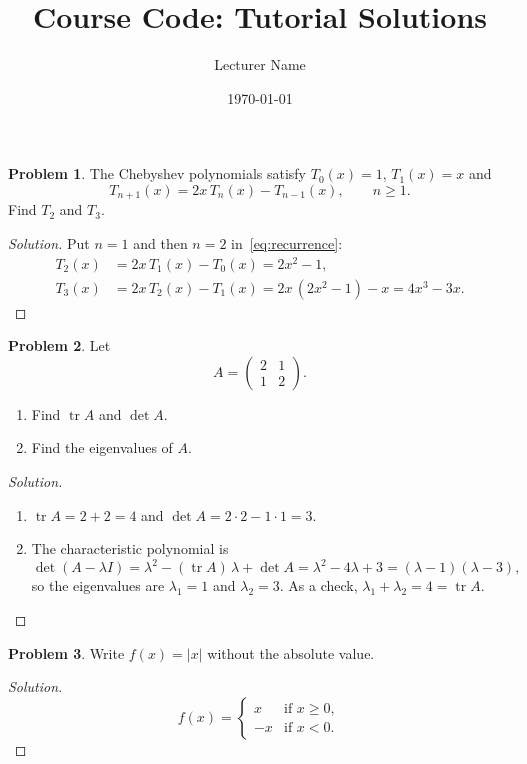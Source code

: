\documentclass[11pt,a4paper]{article}
\title{Course Code: Tutorial Solutions}%
\author{Lecturer Name}%
\date{\today}
\theoremstyle{definition}
\newtheorem{problem}{Problem}
\newenvironment{solution}{\begin{proof}[Solution]}{\end{proof}}
\DeclareMathOperator{\tr}{tr}
\begin{document}
\maketitle

\begin{problem}
  \label{prob:chebyshev}
  The Chebyshev polynomials satisfy $T_0(x) = 1$, $T_1(x) = x$ and
  \begin{equation}
    T_{n+1}(x) = 2x\,T_n(x) - T_{n-1}(x), \qquad n \geq 1.
    \label{eq:recurrence}
  \end{equation}
  Find $T_2$ and $T_3$.
\end{problem}

\begin{solution}
  Put $n = 1$ and then $n = 2$ in~\eqref{eq:recurrence}:
  \begin{align*}
    T_2(x) &= 2x\,T_1(x) - T_0(x) = 2x^2 - 1, \\
    T_3(x) &= 2x\,T_2(x) - T_1(x) = 2x\,(2x^2 - 1) - x = 4x^3 - 3x.
  \end{align*}
\end{solution}

\begin{problem}
  \label{prob:matrix}
  Let
  \[
    A = \begin{pmatrix} 2 & 1 \\ 1 & 2 \end{pmatrix}.
  \]
  \begin{enumerate}[label=(\alph*)]
    \item Find $\tr A$ and $\det A$.
    \item Find the eigenvalues of $A$.
  \end{enumerate}
\end{problem}

\begin{solution}
  \begin{enumerate}[label=(\alph*)]
    \item $\tr A = 2 + 2 = 4$ and $\det A = 2 \cdot 2 - 1 \cdot 1 = 3$.
    \item The characteristic polynomial is
      \[
        \det(A - \lambda I) = \lambda^2 - (\tr A)\,\lambda + \det A
                            = \lambda^2 - 4\lambda + 3 = (\lambda - 1)(\lambda - 3),
      \]
      so the eigenvalues are $\lambda_1 = 1$ and $\lambda_2 = 3$.
      As a check, $\lambda_1 + \lambda_2 = 4 = \tr A$.
  \end{enumerate}
\end{solution}

\begin{problem}
  \label{prob:piecewise}
  Write $f(x) = \lvert x \rvert$ without the absolute value.
\end{problem}

\begin{solution}
  \[
    f(x) =
    \begin{cases}
      x  & \text{if } x \geq 0, \\
      -x & \text{if } x < 0.
    \end{cases}
  \]
\end{solution}
\end{document}
